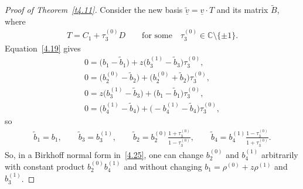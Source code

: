 \documentclass[10pt,a4paper]{amsart}
\numberwithin{equation}{section}
\numberwithin{figure}{section}
\newcommand{\C}{{\mathbb C}}
\newcommand{\www}{\widetilde}
\newcommand{\uuuu}{\underline}
\begin{document}
\begin{proof}[Proof of Theorem~\ref{t4.11}]
Consider the new basis $\uuuu{\www v}=\uuuu{v}\cdot T$
and its matrix $\www B$, where
\begin{gather*}%
T=C_1+\tau_3^{(0)}D \qquad\text{for some}\quad \tau_3^{(0)}\in\C\setminus\{\pm 1\}.
\end{gather*}
Equation~\eqref{4.19} gives
\begin{gather*}
0= \big(b_1-\www b_1\big)+z\big(b_3^{(1)}-\www b_3\big)\tau_3^{(0)},
\\
0= \big(b_2^{(0)}-\www b_2\big)+\big(b_2^{(0)}+\www b_2\big)\tau_3^{(0)},
\\
0= z\big(b_3^{(1)}-\www b_3\big)+\big(b_1-\www b_1\big)\tau_3^{(0)},
\\
0= \big(b_4^{(1)}-\www b_4\big) + \big({-}b_4^{(1)}-\www b_4\big)\tau_3^{(0)},
\end{gather*}
so
\begin{gather}\label{4.33}
\www b_1= b_1,\qquad
\www b_3=b_3^{(1)},\qquad
\www b_2= b_2^{(0)}\frac{1+\tau_3^{(0)}}{1-\tau_3^{(0)}},\qquad
 \www b_4= b_4^{(1)}\frac{1-\tau_3^{(0)}}{1+\tau_3^{(0)}}.
\end{gather}
So, in a Birkhoff normal form in~\eqref{4.25},
one can change $b_2^{(0)}$ and $b_4^{(1)}$ arbitrarily
with constant product $b_2^{(0)}b_4^{(1)}$ and without
changing $b_1=\rho^{(0)}+z\rho^{(1)}$ and $b_3^{(1)}$.



\end{proof}
\end{document}

